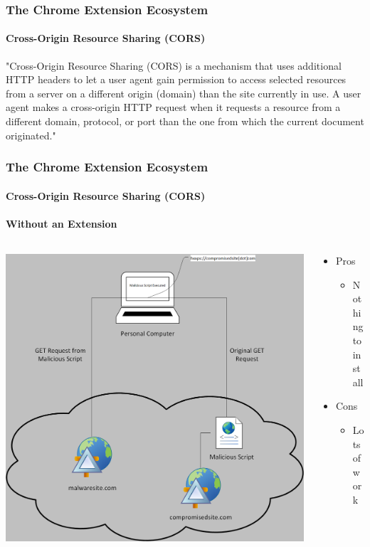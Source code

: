 \documentclass[aspectratio=169]{beamer}
\begin{document}
\begin{frame}
  \frametitle{The Chrome Extension Ecosystem}
  \framesubtitle{Cross-Origin Resource Sharing (CORS)}
  \begin{center}
    \begin{tcolorbox}[title=MDN Quote,colback=gray]
      "Cross-Origin Resource Sharing (CORS) is a mechanism that uses additional HTTP headers to let a
      user agent gain permission to access selected resources from a server on a different origin (domain)
      than the site currently in use.
      A user agent makes a cross-origin HTTP request when it requests a resource from a different domain,
      protocol, or port than the one from which the current document originated."
    \end{tcolorbox}
  \end{center}
\end{frame}
\begin{frame}
  \frametitle{The Chrome Extension Ecosystem}
  \framesubtitle{Cross-Origin Resource Sharing (CORS)}
  \framesubtitle{Without an Extension}
  \begin{columns}
    \begin{column}{0.5\textwidth}
      \includegraphics[scale=0.39]{cors}
    \end{column}
    \begin{column}{0.5\textwidth}
      \begin{itemize}
      \item Pros
        \begin{itemize}
          \item Nothing to install
        \end{itemize}
      \item Cons
        \begin{itemize}
          \item Lots of work
        \end{itemize}
      \end{itemize}
    \end{column}
  \end{columns}
\end{frame}
\end{document}
